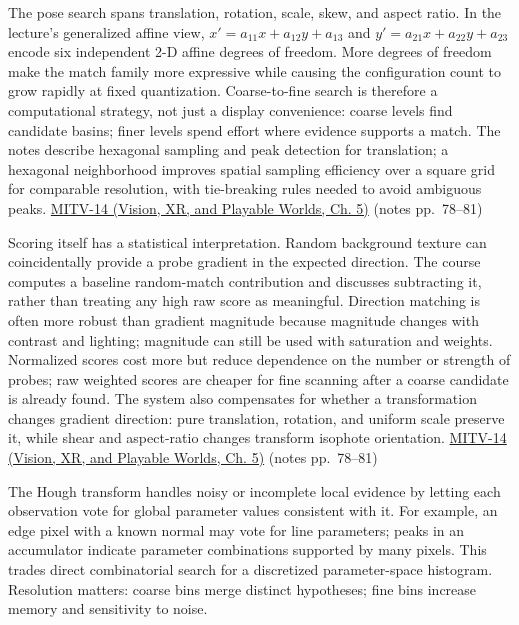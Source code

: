 The pose search spans translation, rotation, scale, skew, and aspect ratio. In the lecture's generalized affine view, \(x'=a_{11}x+a_{12}y+a_{13}\) and \(y'=a_{21}x+a_{22}y+a_{23}\) encode six independent 2-D affine degrees of freedom. More degrees of freedom make the match family more expressive while causing the configuration count to grow rapidly at fixed quantization. Coarse-to-fine search is therefore a computational strategy, not just a display convenience: coarse levels find candidate basins; finer levels spend effort where evidence supports a match. The notes describe hexagonal sampling and peak detection for translation; a hexagonal neighborhood improves spatial sampling efficiency over a square grid for comparable resolution, with tie-breaking rules needed to avoid ambiguous peaks. \href{../07-Vision-XR-and-Playable-Worlds/main.pdf\#nameddest=04-visual-computing-ii-ch036-mitv-14---inspection-in-patquick-hough-transform-homography-position-determination-multi-scale}{MITV-14 (Vision, XR, and Playable Worlds, Ch. 5)} (notes pp.~78--81)

Scoring itself has a statistical interpretation. Random background texture can coincidentally provide a probe gradient in the expected direction. The course computes a baseline random-match contribution and discusses subtracting it, rather than treating any high raw score as meaningful. Direction matching is often more robust than gradient magnitude because magnitude changes with contrast and lighting; magnitude can still be used with saturation and weights. Normalized scores cost more but reduce dependence on the number or strength of probes; raw weighted scores are cheaper for fine scanning after a coarse candidate is already found. The system also compensates for whether a transformation changes gradient direction: pure translation, rotation, and uniform scale preserve it, while shear and aspect-ratio changes transform isophote orientation. \href{../07-Vision-XR-and-Playable-Worlds/main.pdf\#nameddest=04-visual-computing-ii-ch036-mitv-14---inspection-in-patquick-hough-transform-homography-position-determination-multi-scale}{MITV-14 (Vision, XR, and Playable Worlds, Ch. 5)} (notes pp.~78--81)

The Hough transform handles noisy or incomplete local evidence by letting each observation vote for global parameter values consistent with it. For example, an edge pixel with a known normal may vote for line parameters; peaks in an accumulator indicate parameter combinations supported by many pixels. This trades direct combinatorial search for a discretized parameter-space histogram. Resolution matters: coarse bins merge distinct hypotheses; fine bins increase memory and sensitivity to noise.

